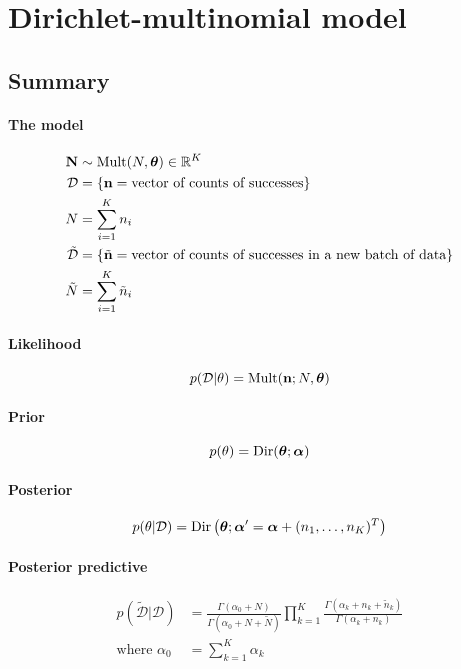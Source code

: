 \section{Dirichlet-multinomial model}
\subsection{Summary}
\paragraph{The model}
    \begin{align}
        \boldsymbol{\mathbf{N}}      &\sim \operatorname{Mult}(N, \boldsymbol{\mathbf{\theta}}) \in \mathbb R^K \\
        \mathcal D  &= \{\boldsymbol{\mathbf{n}} = \text{vector of counts of successes}\} \\
        N           &= \sum_{i = 1}^K n_i \\
        \tilde{\mathcal D} &= \{\tilde{\boldsymbol{\mathbf{n}}} = \text{vector of counts of successes in a new batch of data}\} \\
        \tilde N          &= \sum_{i = 1}^K \tilde n_i
    \end{align}

\paragraph{Likelihood}
    \begin{equation}
        p(\mathcal D | \theta) = \operatorname{Mult}(\boldsymbol{\mathbf{n}}; N, \boldsymbol{\mathbf{\theta}})
    \end{equation}

\paragraph{Prior}
    \begin{equation}
        p(\theta)   = \operatorname{Dir}(\boldsymbol{\mathbf{\theta}}; \boldsymbol{\mathbf{\alpha}})
    \end{equation}

\paragraph{Posterior}
    \begin{equation}
        p(\theta | \mathcal D) = \operatorname{Dir}\left(\boldsymbol{\mathbf{\theta}}; \boldsymbol{\mathbf{\alpha}}' = \boldsymbol{\mathbf{\alpha}} + (n_1, \dotsc, n_K)^T\right)
    \end{equation}

\paragraph{Posterior predictive}
    \begin{align}
        p(\tilde{\mathcal D} | \mathcal D) &= \frac{\Gamma(\alpha_0 + N)}{\Gamma(\alpha_0 + N + \tilde N)} \prod_{k = 1}^K \frac{\Gamma(\alpha_k + n_k + \tilde n_k)}{\Gamma(\alpha_k + n_k)} \\
        \text{where } \alpha_0 &= \sum_{k = 1}^K \alpha_k
    \end{align}

